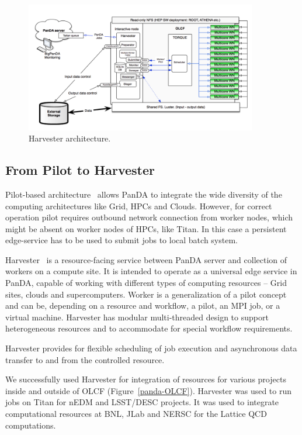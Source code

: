 \documentclass{webofc}
\begin{document}
\begin{figure}
  \centering
  \includegraphics[width=0.90\textwidth]{figures/Panda_at_OLCF.png}
  \caption{Harvester architecture.}
  \label{fig:panda-OLCF}
\end{figure}

\subsection{From Pilot to Harvester} \label{section_harvester}

Pilot-based architecture~\cite{Nilsson_2008} allows PanDA to integrate the wide diversity of the computing architectures like Grid,  HPCs and Clouds. However, for correct operation pilot requires outbound network connection from worker nodes, which might be absent on worker nodes of HPCs, like Titan. In this case a persistent edge-service has to be used to submit jobs to local batch system.

Harvester~\cite{Megino_2017} is a resource-facing service between PanDA server and collection of workers on a compute site. It is intended to operate as a universal edge service in PanDA, capable of working with different types of computing resources -- Grid sites, clouds and supercomputers. Worker is a generalization of a pilot concept and can be, depending on a resource and workflow, a pilot, an MPI job, or a virtual machine. Harvester has modular multi-threaded design to support heterogeneous resources and to accommodate for special workflow requirements.

Harvester provides for flexible scheduling of job execution and asynchronous data transfer to and from the controlled resource.

We successfully used Harvester for integration of resources for various projects inside and outside of OLCF (Figure~\ref{panda-OLCF}). Harvester was used to run jobs on Titan for nEDM and LSST/DESC projects. It was used to integrate computational resources at BNL, JLab and NERSC for the Lattice QCD computations.
\end{document}
